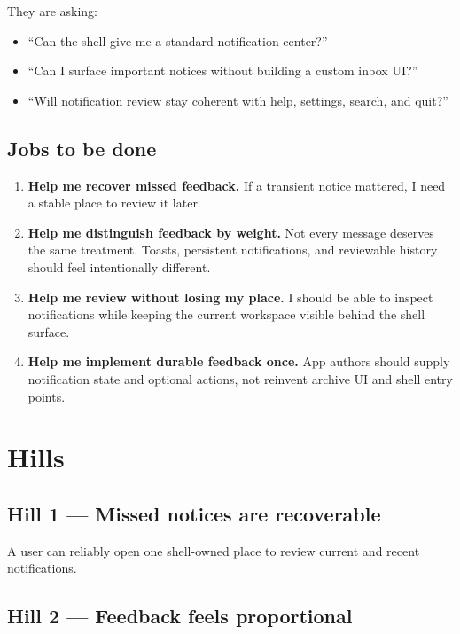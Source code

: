 They are asking:

\begin{itemize}
\tightlist
\item
  ``Can the shell give me a standard notification center?''
\item
  ``Can I surface important notices without building a custom inbox UI?''
\item
  ``Will notification review stay coherent with help, settings, search, and quit?''
\end{itemize}

\subsection{Jobs to be done}\label{record-053-jobs-to-be-done}

\begin{enumerate}
\def\labelenumi{\arabic{enumi}.}
\item
  \textbf{Help me recover missed feedback.} If a transient notice mattered, I need a stable place to review it later.
\item
  \textbf{Help me distinguish feedback by weight.} Not every message deserves the same treatment. Toasts, persistent notifications, and reviewable history should feel intentionally different.
\item
  \textbf{Help me review without losing my place.} I should be able to inspect notifications while keeping the current workspace visible behind the shell surface.
\item
  \textbf{Help me implement durable feedback once.} App authors should supply notification state and optional actions, not reinvent archive UI and shell entry points.
\end{enumerate}

\section{Hills}\label{record-053-hills}

\subsection{Hill 1 --- Missed notices are recoverable}\label{record-053-hill-1-missed-notices-are-recoverable}

A user can reliably open one shell-owned place to review current and recent notifications.

\subsection{Hill 2 --- Feedback feels proportional}\label{record-053-hill-2-feedback-feels-proportional}

